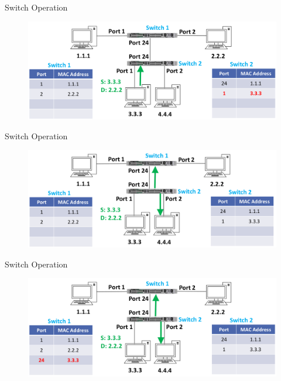 \documentclass[pdflatex,compress,mathserif]{beamer}
\begin{document}
\begin{frame}{Switch Operation}
	\begin{figure}
		\centering
		\includegraphics[width=\linewidth]{img/img21}
	\end{figure}
\end{frame}

\begin{frame}{Switch Operation}
	\begin{figure}
		\centering
		\includegraphics[width=\linewidth]{img/img22}
	\end{figure}
\end{frame}

\begin{frame}{Switch Operation}
	\begin{figure}
		\centering
		\includegraphics[width=\linewidth]{img/img23}
	\end{figure}
\end{frame}
\end{document}
